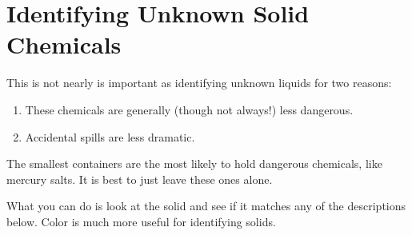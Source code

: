 \section{Identifying Unknown Solid Chemicals}

This is not nearly is important as identifying unknown liquids 
for two reasons:
\begin{enumerate}
\item These chemicals are generally (though not always!) less dangerous.
\item Accidental spills are less dramatic. 
\end{enumerate}
The smallest containers are the most likely to hold dangerous chemicals, 
like mercury salts. 
It is best to just leave these ones alone.

What you can do is look at the solid 
and see if it matches any of the descriptions below.
Color is much more useful for identifying solids.

